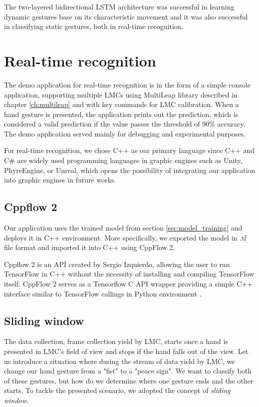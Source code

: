 The two-layered bidirectional LSTM architecture was successful in learning dynamic gestures base on its characteristic movement and it was also successful in classifying static gestures, both in real-time recognition.

\section{Real-time recognition}
\label{real_time_recognition}

The demo application for real-time recognition is in the form of a simple console application, supporting multiple LMCs using MultiLeap \cite{tomasMultileap} library described in chapter \ref{ch:multileap} and with key commands for LMC calibration. When a hand gesture is presented, the application prints out the prediction, which is considered a valid prediction if the value passes the threshold of 90\% accuracy. The demo application served mainly for debugging and experimental purposes.

For real-time recognition, we chose C++ as our primary language since C++ and C\# are widely used programming languages in graphic engines such as Unity, PhyreEngine, or Unreal, which opens the possibility of integrating our application into graphic engines in future works.

\subsection{Cppflow 2}

Our application uses the trained model from section \ref{sec:model_training} and deploys it in C++ environment. More specifically, we exported the model in .tf file format and imported it into C++ using CppFlow 2.

Cppflow 2 is an API created by Sergio Izquierdo, allowing the user to run TensorFlow in C++ without the necessity of installing and compiling TensorFlow itself. CppFlow 2 serves as a Tensorflow C API wrapper providing a simple C++ interface similar to TensorFlow callings in Python environment \cite{cppflow}. 

\subsection{Sliding window}

The data collection, frame collection yield by LMC, starts once a hand is presented in LMC's field of view and stops if the hand falls out of the view. Let us introduce a situation where during the stream of data yield by LMC, we change our hand gesture from a "fist" to a "peace sign". We want to classify both of these gestures, but how do we determine where one gesture ends and the other starts. To tackle the presented scenario, we adopted the concept of \textit{sliding window}.

